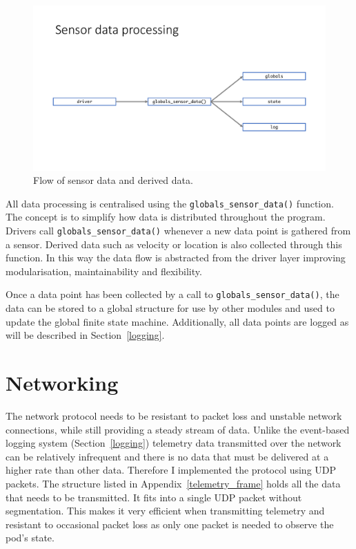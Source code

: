 \begin{figure}[H]
    \centering \includegraphics[width=1.0\textwidth]{./figures/dataflow.pdf}
    \caption{Flow of sensor data and derived data.}
    \label{fig:dataflow}
\end{figure}

All data processing is centralised using the \texttt{globals_sensor_data()} function. The concept is to simplify how data is distributed throughout the program. Drivers call \texttt{globals_sensor_data()} whenever a new data point is gathered from a sensor. Derived data such as velocity or location is also collected through this function. In this way the data flow is abstracted from the driver layer improving modularisation, maintainability and flexibility.

Once a data point has been collected by a call to \texttt{globals_sensor_data()}, the data can be stored to a global structure for use by other modules and used to update the global finite state machine. Additionally, all data points are logged as will be described in Section~\ref{logging}.

\section{Networking}

The network protocol needs to be resistant to packet loss and unstable network connections, while still providing a steady stream of data. Unlike the event-based logging system (Section~\ref{logging}) telemetry data transmitted over the network can be relatively infrequent and there is no data that must be delivered at a higher rate than other data. Therefore I implemented the protocol using UDP packets. The structure listed in Appendix~\ref{telemetry_frame} holds all the data that needs to be transmitted. It fits into a single UDP packet without segmentation. This makes it very efficient when transmitting telemetry and resistant to occasional packet loss as only one packet is needed to observe the pod's state.

